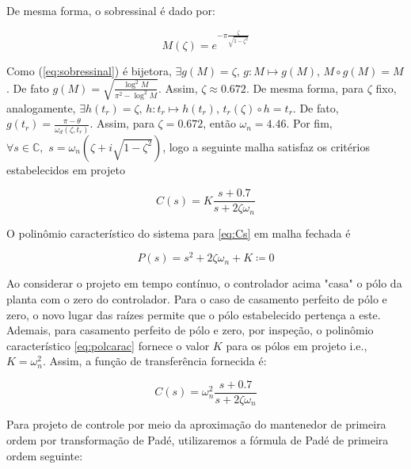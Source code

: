\documentclass[twoside, fleqn]{article}
\begin{document}
    De mesma forma, o sobressinal é dado por:
    
        \begin{equation}
            M(\zeta) = e^{-\pi \frac{\zeta}{\sqrt{1-\zeta^2}}}
            \label{eq:sobressinal}
        \end{equation}
    
    Como (\ref{eq:sobressinal}) é bijetora, $\exists g(M) = \zeta \mbox{, } g: M \longmapsto g(M) \mbox{, } M \circ g (M) = M$. De fato $g(M) = \sqrt{\frac{\log^2{M}}{\pi^2 - \log^2{M}}}$. Assim, $\zeta \approx 0.672$. De mesma forma, para $\zeta$ fixo, analogamente, $\exists h(t_r) = \zeta\mbox{, }h: t_r \longmapsto h(t_r)\mbox{, } t_r(\zeta) \circ h = t_r$. De fato, $g(t_r) = \frac{\pi - \theta}{\omega_d(\zeta, t_r)}$. Assim, para $\zeta = 0.672$, então $\omega_n = 4.46$.
    Por fim, $\forall s \in \mathbb{C}, \,\, s = \omega_n (\zeta + i \sqrt{1 - \zeta^2})$, logo a seguinte malha satisfaz os critérios estabelecidos em projeto
    
        \begin{equation}
        C(s) = K \frac{s + 0.7}{s + 2 \zeta \omega_n}
        \label{eq:Cs}
        \end{equation}
    
    O polinômio característico do sistema para \eqref{eq:Cs} em malha fechada é 
    
        \begin{equation}
        P(s) = s^2 + 2\zeta \omega_n + K \coloneqq 0
        \label{eq:polcarac}
        \end{equation}
    
    Ao considerar o projeto em tempo contínuo, o controlador acima "casa" o pólo da planta com o zero do controlador. Para o caso de casamento perfeito de pólo e zero, o novo lugar das raízes permite que o pólo estabelecido pertença a este. Ademais, para casamento perfeito de pólo e zero, por inspeção, o polinômio característico \eqref{eq:polcarac} fornece o valor $K$ para os pólos em projeto i.e., $K = \omega_n^2$. Assim, a função de transferência fornecida é:
    
        \begin{equation}
            C(s) = \omega_n^2 \frac{s + 0.7}{s + 2 \zeta \omega_n}
        \end{equation}
        
    Para projeto de controle por meio da aproximação do mantenedor de primeira ordem por transformação de Padé, utilizaremos a fórmula de Padé de primeira ordem seguinte:
    
\end{document}
